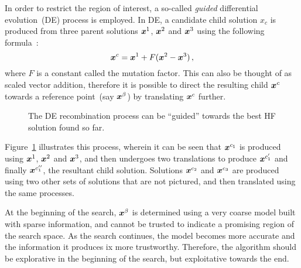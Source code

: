 In order to restrict the region of interest, a so-called \emph{guided} differential evolution~(DE) process is employed. In DE, a candidate child solution $x_c$ is produced from three parent solutions $\boldsymbol{x}^1$, $\boldsymbol{x}^2$ and $\boldsymbol{x}^3$ using the following formula~\cite{storn1997differential}:
\begin{equation}
\boldsymbol{x}^c = \boldsymbol{x}^1 + F(\boldsymbol{x}^2 - \boldsymbol{x}^3)\,,
\end{equation}
where $F$ is a constant called the mutation factor. This can also be thought of as scaled vector addition, therefore it is possible to direct the resulting child $\boldsymbol{x}^c$ towards a reference point~(say $\boldsymbol{x}^\beta$) by translating $\boldsymbol{x}^c$ further.


\begin{figure}[h!]
\centering
{}
\caption{The DE recombination process can be ``guided'' towards the best HF solution found so far.}\label{fig:guide-DE}
\end{figure}

Figure~\ref{fig:guide-DE} illustrates this process, wherein it can be seen that $\boldsymbol{x}^{c_1}$ is produced using $\boldsymbol{x}^1$, $\boldsymbol{x}^2$ and $\boldsymbol{x}^3$, and then undergoes two translations to produce $\boldsymbol{x}^{c_1'}$ and finally $\boldsymbol{x}^{c_1''}$, the resultant child solution. Solutions $\boldsymbol{x}^{c_2}$ and $\boldsymbol{x}^{c_3}$ are produced using two other sets of solutions that are not pictured, and then translated using the same processes. 

At the beginning of the search, $\boldsymbol{x}^\beta$ is determined using a very coarse model built with sparse information, and cannot be trusted to indicate a promising region of the search space. As the search continues, the model becomes more accurate and the information it produces ix more trustworthy. Therefore, the algorithm should be explorative in the beginning of the search, but exploitative towards the end. 

